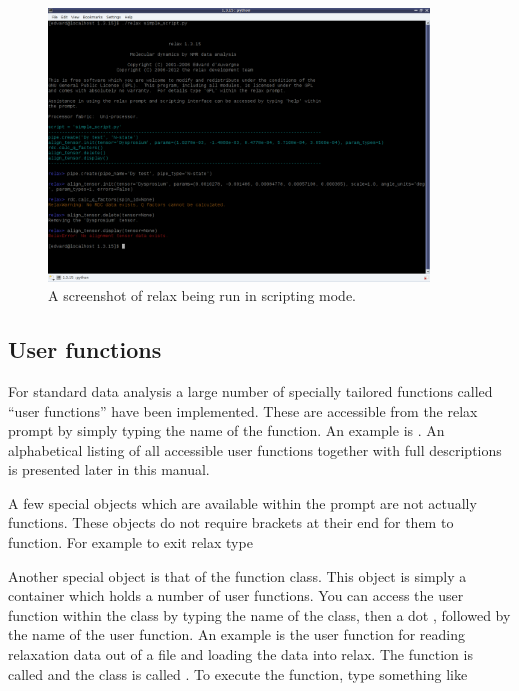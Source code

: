 \begin{figure}
\centerline{\includegraphics[width=0.9\textwidth, bb=14 14 1065 768]{graphics/screenshots/relax_script_mode}}
\caption[Scripting screenshot]{A screenshot of relax being run in scripting mode.}\label{fig: relax script}
\end{figure}



\subsection{User functions}

For standard data analysis a large number of specially tailored functions called ``user functions'' have been implemented.  These are accessible from the relax prompt by simply typing the name of the function.  An example is .  An alphabetical listing of all accessible user functions together with full descriptions is presented later in this manual.

A few special objects which are available within the prompt are not actually functions.  These objects do not require brackets at their end for them to function.  For example to exit relax type


Another special object is that of the function class.  This object is simply a container which holds a number of user functions.  You can access the user function within the class by typing the name of the class, then a dot , followed by the name of the user function.  An example is the user function for reading relaxation data out of a file and loading the data into relax.  The function is called  and the class is called .  To execute the function, type something like

